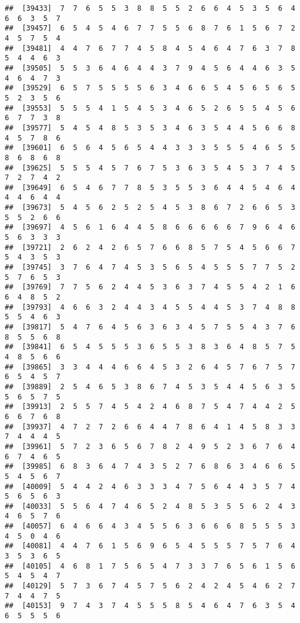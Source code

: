 \documentclass[
]{book}
\begin{document}
\begin{verbatim}
##  [39433]  7  7  6  5  5  3  8  8  5  5  2  6  6  4  5  3  5  6  4  6  6  3  5  7
##  [39457]  6  5  4  5  4  6  7  7  5  5  6  8  7  6  1  5  6  7  2  4  5  7  5  4
##  [39481]  4  4  7  6  7  7  4  5  8  4  5  4  6  4  7  6  3  7  8  5  4  4  6  3
##  [39505]  5  5  3  6  4  6  4  4  3  7  9  4  5  6  4  4  6  3  5  4  6  4  7  3
##  [39529]  6  5  7  5  5  5  5  6  3  4  6  6  5  4  5  6  5  6  5  5  2  3  5  6
##  [39553]  5  5  5  4  1  5  4  5  3  4  6  5  2  6  5  5  4  5  6  6  7  7  3  8
##  [39577]  5  4  5  4  8  5  3  5  3  4  6  3  5  4  4  5  6  6  8  4  5  7  8  6
##  [39601]  6  5  6  4  5  6  5  4  4  3  3  3  5  5  5  4  6  5  5  8  6  8  6  8
##  [39625]  5  5  5  4  5  7  6  7  5  3  6  3  5  4  5  3  7  4  5  7  2  7  4  2
##  [39649]  6  5  4  6  7  7  8  5  3  5  5  3  6  4  4  5  4  6  4  4  4  6  4  4
##  [39673]  5  4  5  6  2  5  2  5  4  5  3  8  6  7  2  6  6  5  3  5  5  2  6  6
##  [39697]  4  5  6  1  6  4  4  5  8  6  6  6  6  6  7  9  6  4  6  5  6  3  3  3
##  [39721]  2  6  2  4  2  6  5  7  6  6  8  5  7  5  4  5  6  6  7  5  4  3  5  3
##  [39745]  3  7  6  4  7  4  5  3  5  6  5  4  5  5  5  7  7  5  2  5  7  6  5  3
##  [39769]  7  7  5  6  2  4  4  5  3  6  3  7  4  5  5  4  2  1  6  6  4  8  5  2
##  [39793]  4  6  6  3  2  4  4  3  4  5  5  4  4  5  3  7  4  8  8  5  5  4  6  3
##  [39817]  5  4  7  6  4  5  6  3  6  3  4  5  7  5  5  4  3  7  6  8  5  5  6  8
##  [39841]  6  5  4  5  5  5  3  6  5  5  3  8  3  6  4  8  5  7  5  4  8  5  6  6
##  [39865]  3  3  4  4  4  6  6  4  5  3  2  6  4  5  7  6  7  5  7  6  5  4  5  7
##  [39889]  2  5  4  6  5  3  8  6  7  4  5  3  5  4  4  5  6  3  5  5  6  5  7  5
##  [39913]  2  5  5  7  4  5  4  2  4  6  8  7  5  4  7  4  4  2  5  6  6  7  6  8
##  [39937]  4  7  2  7  2  6  6  4  4  7  8  6  4  1  4  5  8  3  3  7  4  4  4  5
##  [39961]  5  7  2  3  6  5  6  7  8  2  4  9  5  2  3  6  7  6  4  6  7  4  6  5
##  [39985]  6  8  3  6  4  7  4  3  5  2  7  6  8  6  3  4  6  6  5  5  4  5  6  7
##  [40009]  5  4  4  2  4  6  3  3  3  4  7  5  6  4  4  3  5  7  4  5  6  5  6  3
##  [40033]  5  5  6  4  7  4  6  5  2  4  8  5  3  5  5  6  2  4  3  4  6  5  7  6
##  [40057]  6  4  6  6  4  3  4  5  5  6  3  6  6  6  8  5  5  5  3  4  5  0  4  6
##  [40081]  4  4  7  6  1  5  6  9  6  5  4  5  5  5  7  5  7  6  4  3  5  3  6  5
##  [40105]  4  6  8  1  7  5  6  5  4  7  3  3  7  6  5  6  1  5  6  5  4  5  4  7
##  [40129]  5  7  3  6  7  4  5  7  5  6  2  4  2  4  5  4  6  2  7  7  4  4  7  5
##  [40153]  9  7  4  3  7  4  5  5  5  8  5  4  6  4  7  6  3  5  4  6  5  5  5  6

\end{verbatim}
\end{document}
